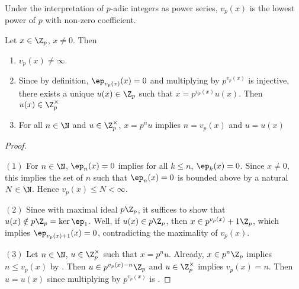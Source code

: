 \begin{rmk}
  
  Under the interpretation of $p$-adic integers as power series, 
  $v_p(x)$ is the lowest power of $p$ with non-zero coefficient. 
\end{rmk}

\begin{prop}
  
  Let $x \in \Z_p$, $x \neq 0$. 
  Then \begin{enumerate}
    \item $v_p(x) \neq \infty$. 
    \item Since by definition, $\ep_{v_p(x)}(x) = 0$ and 
    multiplying by $p^{v_p(x)}$ is injective, 
    there exists a unique $u(x) \in \Z_p$ such that $x = p^{v_p(x)}u(x)$.
    Then $u(x) \in \Z_p^\times$
    \item For all $n \in \N$ and $u \in \Z_p^\times$, 
    $x = p^n u$ implies $n = v_p(x)$ and $u = u(x)$
  \end{enumerate}
\end{prop}
\begin{proof}~

  $(1)$ For $n \in \N$, $\ep_n(x) = 0$ implies for all $k \leq n$, 
  $\ep_k(x) = 0$. 
  Since $x \neq 0$, this implies the set of $n$ such that 
  $\ep_n(x) = 0$ is bounded above by a natural $N \in \N$. 
  Hence $v_p(x) \leq N < \infty$. 
  
  $(2)$ Since  with 
  maximal ideal $p\Z_p$, it suffices to show that 
  $u(x) \notin p\Z_p = \ker\ep_1$. 
  Well, if $u(x) \in p\Z_p$, then $x \in p^{v_p(x)}+1\Z_p$, 
  which implies $\ep_{v_p(x) + 1}(x) = 0$, 
  contradicting the maximality of $v_p(x)$. 

  $(3)$ Let $n \in \N$, $u \in \Z_p^\times$ such that $x = p^n u$. 
  Already, $x \in p^n\Z_p$ implies $n \leq v_p(x)$ by 
  . 
  Then $u \in p^{v_p(x) - n}\Z_p$ and $u \in \Z_p^\times$
  implies $v_p(x) = n$. 
  Then $u = u(x)$ since multiplying by $p^{v_p(x)}$ is 
  . 
\end{proof}


